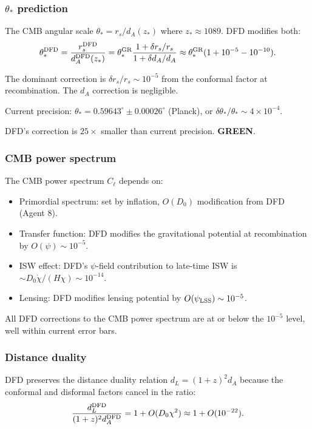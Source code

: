 \documentclass[11pt,a4paper]{article}
\newcommand{\GREEN}{\textcolor{dfdgreen}{\textbf{GREEN}}}
\begin{document}
\subsubsection{$\theta_*$ prediction}

The CMB angular scale $\theta_* = r_s/d_A(z_*)$ where $z_* \approx 1089$. DFD modifies both:
\begin{equation}
\theta_*^{\rm DFD} = \frac{r_s^{\rm DFD}}{d_A^{\rm DFD}(z_*)} = \theta_*^{\rm GR}\frac{1 + \delta r_s/r_s}{1 + \delta d_A/d_A} \approx \theta_*^{\rm GR}(1 + 10^{-5} - 10^{-10}).
\end{equation}

The dominant correction is $\delta r_s/r_s \sim 10^{-5}$ from the conformal factor at recombination. The $d_A$ correction is negligible.

Current precision: $\theta_* = 0.59643^\circ \pm 0.00026^\circ$ (Planck), or $\delta\theta_*/\theta_* \sim 4 \times 10^{-4}$.

DFD's correction is $25\times$ smaller than current precision. \GREEN.

\subsubsection{CMB power spectrum}

The CMB power spectrum $C_\ell$ depends on:
\begin{itemize}
\item Primordial spectrum: set by inflation, $O(D_0)$ modification from DFD (Agent 8).
\item Transfer function: DFD modifies the gravitational potential at recombination by $O(\psi) \sim 10^{-5}$.
\item ISW effect: DFD's $\psi$-field contribution to late-time ISW is $\sim D_0\dot\chi/(H\chi) \sim 10^{-14}$.
\item Lensing: DFD modifies lensing potential by $O(\psi_{\rm LSS}) \sim 10^{-5}$.
\end{itemize}

All DFD corrections to the CMB power spectrum are at or below the $10^{-5}$ level, well within current error bars.

\subsubsection{Distance duality}

DFD preserves the distance duality relation $d_L = (1+z)^2 d_A$ because the conformal and disformal factors cancel in the ratio:
\begin{equation}
\frac{d_L^{\rm DFD}}{(1+z)^2 d_A^{\rm DFD}} = 1 + O(D_0 \chi^2) \approx 1 + O(10^{-22}).
\end{equation}
\end{document}
